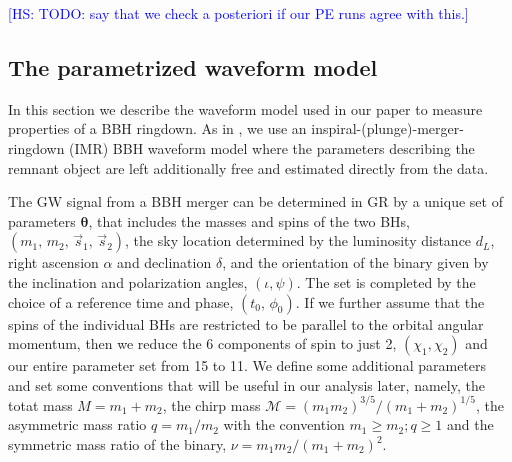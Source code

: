 \documentclass[twocolumn,
               prd,
               aps,
               superscriptaddress,
               tightenlines,
               nofootinbib,
               eqsecnum,
               amsfonts,
               amsmath,
               longbibliography]{revtex4-1}
\newcommand{\hs}[1]{{\textcolor{blue}{{[HS: #1]}} }}
\begin{document}
\hs{TODO: say that we check a posteriori if our PE runs agree with this.}

\subsection{The parametrized waveform model}
\label{sec:review_pSEOB}

In this section we describe the waveform model used in our paper to measure properties of a BBH ringdown. As in \cite{Brito:2018rfr,Ghosh:2021mrv}, we use an inspiral-(plunge)-merger-ringdown (IMR) BBH waveform model where the parameters describing the remnant object are left additionally free and estimated directly from the data.

The GW signal from a BBH merger can be determined in GR by a unique set of parameters $\bm{\theta}$, that
includes the masses and spins of the two BHs, $(m_1,\, m_2,\, \vec{s}_1,\, \vec{s}_2)$, the sky location determined by the luminosity distance $d_L$, right ascension $\alpha$ and declination $\delta$, and the orientation of the binary given by the inclination and polarization angles, $(\iota, \psi)$. The set is completed by the choice of a reference time and phase, $(t_0,\, \phi_0)$. If we further assume that the spins of the individual BHs are restricted to be parallel to the orbital angular momentum, then we reduce the 6 components of spin to just 2, $(\chi_1, \chi_2)$ and our entire parameter set from 15 to 11. We define some additional parameters and set some conventions that will be useful in our analysis later, namely, the totat mass $M=m_1+m_2$, the chirp mass $\mathcal {M}=(m_{1}m_{2})^{3/5}/(m_{1}+m_{2})^{1/5}$, the asymmetric mass ratio $q=m_1/m_2$ with the convention $m_1 \geqslant m_2; q \geqslant 1$ and the symmetric mass ratio of the binary, $\nu = m_1m_2/(m_1+m_2)^2$.
\end{document}
